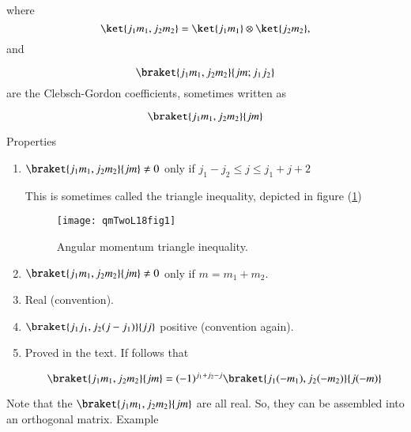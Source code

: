 where
\begin{equation}\label{eqn:qmTwoL18:190}
\ket{ j_1 m_1, j_2 m_2} = \ket{j_1 m_1} \otimes \ket{j_2 m_2},
\end{equation}
and

\begin{equation}\label{eqn:qmTwoL18:210}
\braket{ j_1 m_1, j_2 m_2}{jm ; j_1 j_2} 
\end{equation}
are the Clebsch-Gordon coefficients, sometimes written as 

\begin{equation}\label{eqn:qmTwoL18:230}
\braket{ j_1 m_1, j_2 m_2 }{ jm }
\end{equation}

Properties
\begin{enumerate}
\item $\braket{ j_1 m_1, j_2 m_2 }{ jm } \ne 0$ only if $j_1 - j_2 \le j \le j_1 + j+2$

This is sometimes called the triangle inequality, depicted in figure (\ref{fig:qmTwoL18:qmTwoL18fig1})

\begin{figure}[htp]
   \centering
   \texttt{[image: qmTwoL18fig1]}
   \caption{Angular momentum triangle inequality.}\label{fig:qmTwoL18:qmTwoL18fig1}
\end{figure}

\item $\braket{ j_1 m_1, j_2 m_2 }{ jm } \ne 0$ only if $m = m_1 + m_2$.

\item Real (convention).

\item $\braket{ j_1 j_1, j_2 (j - j_1) }{ j j }$ positive (convention again).

\item Proved in the text.  If follows that 

\begin{equation}\label{eqn:qmTwoL18:250}
\braket{ j_1 m_1, j_2 m_2 }{ j m }
=
(-1)^{j_1 + j_2 - j}
\braket{ j_1 (-m_1), j_2 (-m_2) }{ j (-m) }
\end{equation}
\end{enumerate}

Note that the $\braket{ j_1 m_1, j_2 m_2 }{ j m }$ are all real.  So, they can be assembled into an orthogonal matrix.  Example

